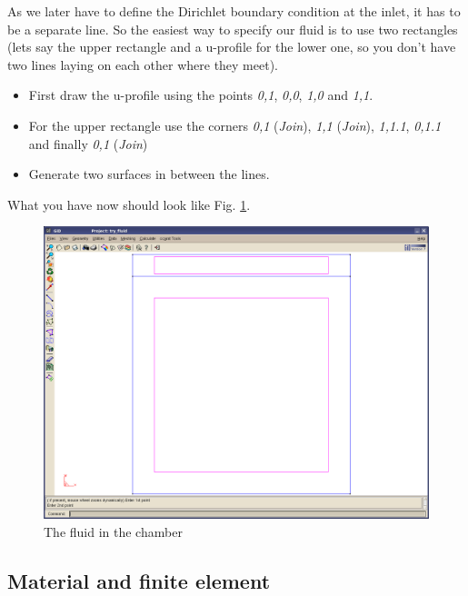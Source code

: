 As we later have to define the Dirichlet boundary condition at the
inlet, it has to be a separate line. So the easiest way to specify
our fluid is to use two rectangles (lets say the upper rectangle and
a u-profile for the lower one, so you don't have two lines laying
on each other where they meet).

\begin{itemize}
\item First draw the u-profile using the points \emph{0,1}, \emph{0,0}, \emph{1,0} and \emph{1,1}.
\item For the upper rectangle use the corners \emph{0,1} (\emph{Join}), \emph{1,1} (\emph{Join}), \emph{1,1.1}, \emph{0,1.1} and finally \emph{0,1} (\emph{Join})
\item Generate two surfaces in between the lines.
\end{itemize}
What you have now should look like Fig. \ref{tut_fsi:4.1}.

%
\begin{figure}[h]
\includegraphics[scale=0.4]{Bilder/fluid_01}


\caption{\label{tut_fsi:4.1} The fluid in the chamber}
\end{figure}



\subsection{Material and finite element}

